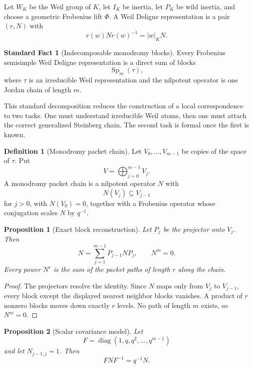 \documentclass[11pt]{amsart}
\newtheorem{proposition}[proposition]{Proposition}
\theoremstyle{definition}
\newtheorem{definition}[definition]{Definition}
\newtheorem{standardfact}[standardfact]{Standard Fact}
\theoremstyle{remark}
\newcommand{\abs}[1]{\left\lvert#1\right\rvert}
\begin{document}
Let \(W_K\) be the Weil group of \(K\), let \(I_K\) be inertia, let \(P_K\) be wild inertia, and choose a geometric Frobenius lift \(\Phi\). A Weil Deligne representation is a pair \((r,N)\) with
\[
r(w)Nr(w)^{-1}=\abs{w}_K N.
\]

\begin{standardfact}[Indecomposable monodromy blocks]\label{fact:spdecomp}
Every Frobenius semisimple Weil Deligne representation is a direct sum of blocks
\[
\operatorname{Sp}_m(\tau),
\]
where \(\tau\) is an irreducible Weil representation and the nilpotent operator is one Jordan chain of length \(m\).
\end{standardfact}

This standard decomposition reduces the construction of a local correspondence to two tasks. One must understand irreducible Weil atoms, then one must attach the correct generalized Steinberg chain. The second task is formal once the first is known.

\begin{definition}[Monodromy packet chain]\label{def:monodromy_chain}
Let \(V_0,\ldots,V_{m-1}\) be copies of the space of \(\tau\). Put
\[
V=\bigoplus_{j=0}^{m-1}V_j.
\]
A monodromy packet chain is a nilpotent operator \(N\) with
\[
N(V_j)\subseteq V_{j-1}
\]
for \(j>0\), with \(N(V_0)=0\), together with a Frobenius operator whose conjugation scales \(N\) by \(q^{-1}\).
\end{definition}

\begin{proposition}[Exact block reconstruction]\label{prop:monodromy_reconstruction}
Let \(P_j\) be the projector onto \(V_j\). Then
\[
N=\sum_{j=1}^{m-1}P_{j-1}NP_j,
\qquad
N^m=0.
\]
Every power \(N^r\) is the sum of the packet paths of length \(r\) along the chain.
\end{proposition}

\begin{proof}
The projectors resolve the identity. Since \(N\) maps only from \(V_j\) to \(V_{j-1}\), every block except the displayed nearest neighbor blocks vanishes. A product of \(r\) nonzero blocks moves down exactly \(r\) levels. No path of length \(m\) exists, so \(N^m=0\).
\end{proof}

\begin{proposition}[Scalar covariance model]\label{prop:scalar_covariance}
Let
\[
F=\operatorname{diag}(1,q,q^2,\ldots,q^{m-1})
\]
and let \(N_{j-1,j}=1\). Then
\[
FNF^{-1}=q^{-1}N.
\]
\end{proposition}
\end{document}
